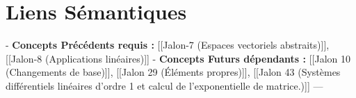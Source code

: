 \documentclass[12pt,a4paper]{report}
\begin{document}
\section{Liens Sémantiques}
-   \textbf{Concepts Précédents requis :} [[Jalon-7 (Espaces vectoriels abstraits)]], [[Jalon-8 (Applications linéaires)]]
-   \textbf{Concepts Futurs dépendants :} [[Jalon 10 (Changements de base)]], [[Jalon 29 (Éléments propres)]], [[Jalon 43 (Systèmes différentiels linéaires d'ordre 1 et calcul de l'exponentielle de matrice.)]]
---\n
\end{document}
